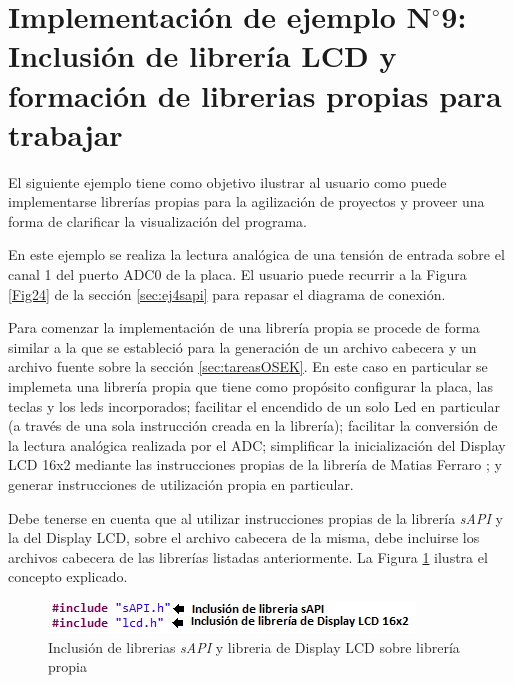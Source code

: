 \documentclass[12pt,letterpaper]{article}
\begin{document}
\section{Implementación de ejemplo N$^{\circ}$9: Inclusión de librería LCD y formación de librerias propias para trabajar}
El siguiente ejemplo tiene como objetivo ilustrar al usuario como puede implementarse librerías propias para la agilización de proyectos y proveer una forma de clarificar la visualización del programa.

En este ejemplo se realiza la lectura analógica de una tensión de entrada sobre el canal 1 del puerto ADC0 de la placa. El usuario puede recurrir a la Figura \ref{Fig24} de la sección \ref{sec:ej4sapi} para repasar el diagrama de conexión.

Para comenzar la implementación de una librería propia se procede de forma similar a la que se estableció para la generación de un archivo cabecera y un archivo fuente sobre la sección \ref{sec:tareasOSEK}. En este caso en particular se implemeta una librería propia que tiene como propósito configurar la placa, las teclas y los leds incorporados; facilitar el encendido de un solo Led en particular (a través de una sola instrucción creada en la librería); facilitar la conversión de la lectura analógica realizada por el ADC; simplificar la inicialización del Display LCD 16x2 mediante las instrucciones propias de la librería de Matias Ferraro \cite{repositoriomatiasferraro}; y generar instrucciones de utilización propia en particular.

Debe tenerse en cuenta que al utilizar instrucciones propias de la librería \textit{sAPI} y la del Display LCD, sobre el archivo cabecera de la misma, debe incluirse los archivos cabecera de las librerías listadas anteriormente. La Figura \ref{Fig47} ilustra el concepto explicado.

\begin{center}
\begin{figure}[!h]
\centering
\includegraphics[width=8 cm]{figuras/f40.png}
\caption{Inclusión de librerias \textit{sAPI} y libreria de Display LCD sobre librería propia}
\label{Fig47}
\end{figure}
\end{center}
\end{document}

